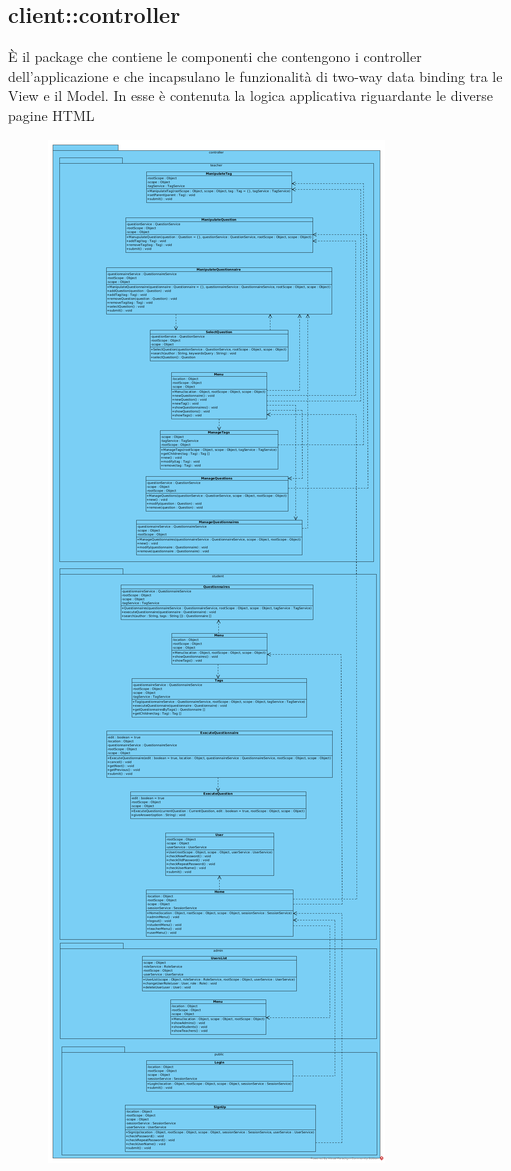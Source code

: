 \subsection{client::controller}
È il package che contiene le componenti che contengono i
controller dell’applicazione e che incapsulano le funzionalità di two-way data binding tra le View e il Model. In esse è contenuta la logica applicativa riguardante le diverse pagine HTML\begin{center}
		\begin{figure}[H]
			\centering \includegraphics[scale=4, max width=\textwidth, max height=\myheight]{../img/diagrammiClassi/client/controller.png}

\end{figure}
\end{center}
